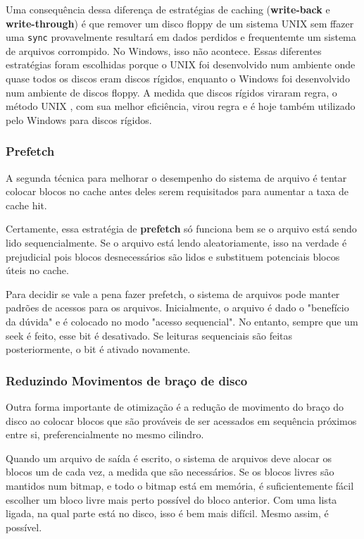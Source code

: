 \documentclass{article}
\newcommand\unix{{\color{red}UNIX} }
\begin{document}
\newpage

Uma consequência dessa diferença de estratégias de caching (\textbf{write-back} e \textbf{write-through}) é que remover um disco floppy de um sistema \unix sem ffazer uma \verb|sync| provavelmente resultará em dados perdidos e frequentemte um sistema de arquivos corrompido. No Windows, isso não acontece. Essas diferentes estratégias foram escolhidas porque o \unix foi desenvolvido num ambiente onde quase todos os discos eram discos rígidos, enquanto o Windows foi desenvolvido num ambiente de discos floppy. A medida que discos rígidos viraram regra, o método \unix, com sua melhor eficiência, virou regra e é hoje também utilizado pelo Windows para discos rígidos.

\subsubsection{Prefetch}

A segunda técnica para melhorar o desempenho do sistema de arquivo é tentar colocar blocos no cache antes deles serem requisitados para aumentar a taxa de cache hit.

Certamente, essa estratégia de \textbf{prefetch} só funciona bem se o arquivo está sendo lido sequencialmente. Se o arquivo está lendo aleatoriamente, isso na verdade é prejudicial pois blocos desnecessários são lidos e substituem potenciais blocos úteis no cache.

Para decidir se vale a pena fazer prefetch, o sistema de arquivos pode manter padrões de acessos para os arquivos. Inicialmente, o arquivo é dado o "benefício da dúvida" e é colocado no modo "acesso sequencial". No entanto, sempre que um seek é feito, esse bit é desativado. Se leituras sequenciais são feitas posteriormente, o bit é ativado novamente.

\subsubsection{Reduzindo Movimentos de braço de disco}

Outra forma importante de otimização é a redução de movimento do braço do disco ao colocar blocos que são prováveis de ser acessados em sequência próximos entre si, preferencialmente no mesmo cilindro.

Quando um arquivo de saída é escrito, o sistema de arquivos deve alocar os blocos um de cada vez, a medida que são necessários. Se os blocos livres são mantidos num bitmap, e todo o bitmap está em memória, é suficientemente fácil escolher um bloco livre mais perto possível do bloco anterior. Com uma lista ligada, na qual parte está no disco, isso é bem mais difícil. Mesmo assim, é possível.
\end{document}
